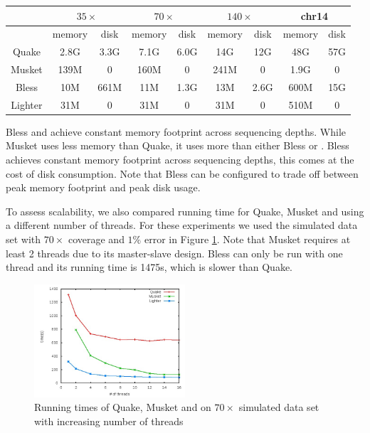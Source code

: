 \documentclass[10pt]{article}
\begin{document}
\begin{tabular}{|c|c|c||c|c||c|c||c|c|} \hline
		& \multicolumn{2}{|c||}{$35\times$} & \multicolumn{2}{|c||}{$70\times$}  & \multicolumn{2}{|c||}{$140\times$} & \multicolumn{2}{|c|}{chr14}  \\ \hline
		& memory & disk & memory & disk & memory & disk & memory & disk \\ \hline
Quake   & 2.8G	& 3.3G & 7.1G & 6.0G & 14G & 12G & 48G & 57G \\ \hline		
Musket	& 139M	& 0 & 160M & 0 & 241M & 0 & 1.9G & 0 \\ \hline
Bless	& 10M	& 661M & 11M & 1.3G & 13M & 2.6G & 600M & 15G \\ \hline
Lighter	& 31M	& 0 & 31M & 0 & 31M & 0 & 510M & 0 \\ \hline
\end{tabular}

Bless and \tool achieve constant memory footprint across sequencing depths.  While Musket uses less memory than Quake, it uses more than either Bless or \tool.  Bless achieves constant memory footprint across sequencing depths, this comes at the cost of disk consumption.  Note that Bless can be configured to trade off between peak memory footprint and peak disk usage.

To assess scalability, we also compared running time for Quake, Musket and \tool using a different number of threads.  For these experiments we used the simulated data set with $70\times$ coverage and $1\%$ error in Figure \ref{fig:runtime}.     Note that Musket requires at least 2 threads due to its master-slave design.  Bless can only be run with one thread and its running time is 1475s, which is slower than Quake.

\begin{figure}[h!]
\begin{center}
\includegraphics[width=0.5\textwidth]{runtime.jpg}
\end{center}
\caption{Running times of Quake, Musket and \tool on $70\times$ simulated data set with increasing number of threads\label{fig:runtime}}
\end{figure}
\end{document}
